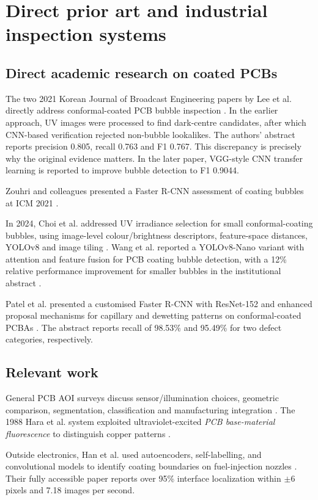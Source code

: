 \section{Direct prior art and industrial inspection systems}
\subsection{Direct academic research on coated PCBs}
The two 2021 Korean Journal of Broadcast Engineering papers by Lee et al. directly address conformal-coated PCB bubble inspection \citep{lee2021cnn,lee2021transfer}. In the earlier approach, UV images were processed to find dark-centre candidates, after which CNN-based verification rejected non-bubble lookalikes. The authors' abstract reports precision 0.805, recall 0.763 and F1 0.767. This discrepancy is precisely why the original evidence matters. In the later paper, VGG-style CNN transfer learning is reported to improve bubble detection to F1 0.9044.

Zouhri and colleagues presented a Faster R-CNN assessment of coating bubbles at ICM 2021 \citep{zouhri2021faster}.

In 2024, Choi et al. addressed UV irradiance selection for small conformal-coating bubbles, using image-level colour/brightness descriptors, feature-space distances, YOLOv8 and image tiling \citep{choi2024uv}. Wang et al. reported a YOLOv8-Nano variant with attention and feature fusion for PCB coating bubble detection, with a 12\% relative performance improvement for smaller bubbles in the institutional abstract \citep{wang2025bubble}.

Patel et al. presented a customised Faster R-CNN with ResNet-152 and enhanced proposal mechanisms for capillary and dewetting patterns on conformal-coated PCBAs \citep{patel2026coverage}. The abstract reports recall of 98.53\% and 95.49\% for two defect categories, respectively.

\subsection{Relevant work}
General PCB AOI surveys discuss sensor/illumination choices, geometric comparison, segmentation, classification and manufacturing integration \citep{ebayyeh2020aoi,zhou2023pcb,ieee2023pcb}. The 1988 Hara et al. system exploited ultraviolet-excited \emph{PCB base-material fluorescence} to distinguish copper patterns \citep{hara1988fluorescent}.

Outside electronics, Han et al. used autoencoders, self-labelling, and convolutional models to identify coating boundaries on fuel-injection nozzles \citep{han2025coating}. Their fully accessible paper reports over 95\% interface localization within $\pm 6$ pixels and 7.18 images per second.

